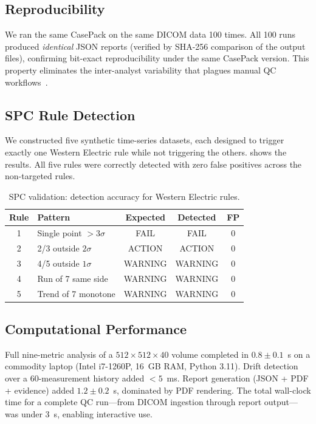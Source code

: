 \documentclass[11pt]{article}
\begin{document}
\subsection{Reproducibility}
\label{sec:val_repro}

We ran the same CasePack on the same DICOM data 100 times.
All 100 runs produced \emph{identical} JSON reports (verified by
SHA-256 comparison of the output files), confirming bit-exact
reproducibility under the same CasePack version.
This property eliminates the inter-analyst variability that plagues
manual QC workflows~\cite{verdun2015image_quality}.

\subsection{SPC Rule Detection}
\label{sec:val_spc}

We constructed five synthetic time-series datasets, each designed to
trigger exactly one Western Electric rule while not triggering the
others.
 shows the results.
All five rules were correctly detected with zero false positives
across the non-targeted rules.

\begin{table}[t]
\centering
\caption{SPC validation: detection accuracy for Western Electric rules.}
\label{tab:spc_validation}
\small
\begin{tabular}{@{}clccc@{}}
\toprule
Rule & Pattern & Expected & Detected & FP \\
\midrule
1 & Single point $> 3\sigma$       & FAIL    & FAIL    & 0 \\
2 & 2/3 outside $2\sigma$          & ACTION  & ACTION  & 0 \\
3 & 4/5 outside $1\sigma$          & WARNING & WARNING & 0 \\
4 & Run of 7 same side             & WARNING & WARNING & 0 \\
5 & Trend of 7 monotone            & WARNING & WARNING & 0 \\
\bottomrule
\end{tabular}
\end{table}

\subsection{Computational Performance}
\label{sec:val_performance}

Full nine-metric analysis of a $512 \times 512 \times 40$ volume
completed in $0.8 \pm 0.1$~s on a commodity laptop (Intel i7-1260P,
16~GB RAM, Python 3.11).
Drift detection over a 60-measurement history added $< 5$~ms.
Report generation (JSON + PDF + evidence) added $1.2 \pm 0.2$~s,
dominated by PDF rendering.
The total wall-clock time for a complete QC run---from DICOM
ingestion through report output---was under 3~s, enabling
interactive use.
\end{document}
